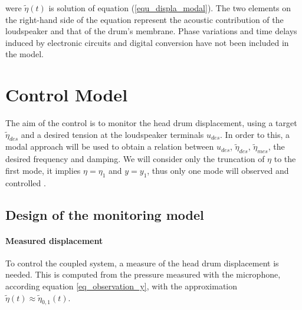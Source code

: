 \documentclass[11pt, twocolumn]{article}
\begin{document}
were $\tilde{\eta}(t)$ is solution of equation (\ref{equ_displa_modal}). The two elements on the right-hand side of the equation represent the acoustic contribution of the loudspeaker and that of the drum's membrane. Phase variations and time delays induced by electronic circuits and digital conversion have not been included in the model.






\section{Control Model}

The aim of the control is to monitor the head drum displacement, using a target $\tilde{\eta}_{des}$ and a desired tension at the loudspeaker terminals $u_{des}$. In order to this, a modal approach will be used to obtain a relation between $u_{des}$, $\tilde{\eta}_{des}$, $\tilde{\eta}_{mes}$, the desired frequency and damping. We will consider only the truncation of $\eta$ to the first mode, it implies $\eta = \eta_1$ and $y = y_1$, thus only one mode will observed and controlled .

\subsection{Design of the monitoring model}
\paragraph{Measured displacement}

To control the coupled system, a measure of the head drum displacement is needed. This is computed from the pressure measured with the microphone, according equation \eqref{eq_observation_y}, with the approximation $\tilde\eta(t) \approx \tilde\eta_{0,1}(t)$.
\end{document}
